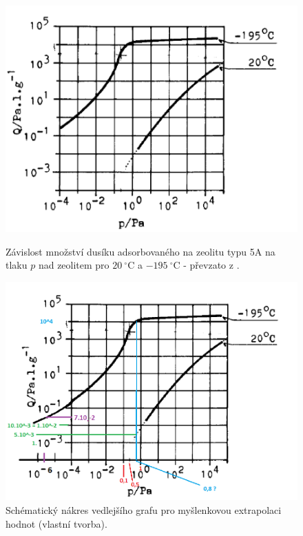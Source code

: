 \documentclass[english]{article}
\newcommand{\unit}[1]{~\mathrm{#1}}
\begin{document}
\begin{figure}[h!]
\centering
\begin{minipage}[t]{.43\textwidth}
\centering
				
				\includegraphics[scale=0.35]{../att/tlak_origo}
				\caption{Závislost množství dusíku adsorbovaného na zeolitu typu 5A na tlaku $p$ nad zeolitem pro $20\unit{^\circ C}$ a $-195\unit{^\circ C}$ - převzato z \cite{bib:praskripta}.}
				\label{fig:s_1}
\end{minipage}%
\hfill
\begin{minipage}[t]{.45\textwidth}
\centering
				\includegraphics[scale=0.35]{../att/tlak_muj}
				\caption{Schématický nákres vedlejšího grafu pro myšlenkovou extrapolaci hodnot (vlastní tvorba).}
				\label{fig:s_2}
\end{minipage}
\end{figure}
\end{document}
